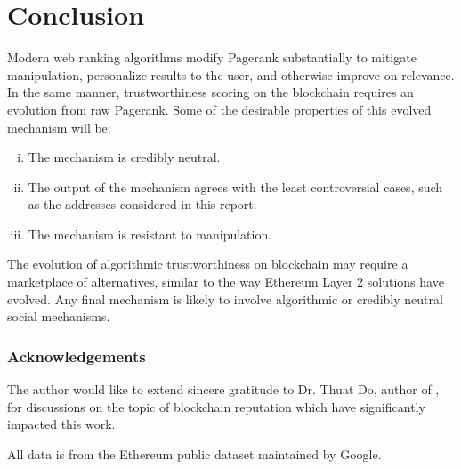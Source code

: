 \documentclass[a4paper]{article}
\begin{document}
\section{Conclusion}

 Modern web ranking algorithms modify Pagerank substantially to mitigate manipulation, personalize results to the user, and otherwise improve on relevance.  In the same manner, trustworthiness scoring on the blockchain requires an evolution from raw Pagerank. Some of the desirable properties of this evolved mechanism will be:
 \begin{enumerate}[i.]
 \item The mechanism is credibly neutral.
 \item The output of the mechanism agrees with the least controversial cases, such as the addresses considered in this report.
 \item The mechanism is resistant to manipulation.
 \end{enumerate}
The evolution of algorithmic trustworthiness on blockchain may require a marketplace of alternatives, similar to the way Ethereum Layer 2 solutions have evolved.  Any final mechanism is likely to involve algorithmic or credibly neutral social mechanisms.

\subsubsection{Acknowledgements}

The author would like to extend sincere gratitude to Dr. Thuat Do, author of \cite{Paven2}, for  discussions on the topic of blockchain reputation which have significantly impacted this work.  

All data is from the Ethereum public dataset maintained by Google.

%
\end{document}
